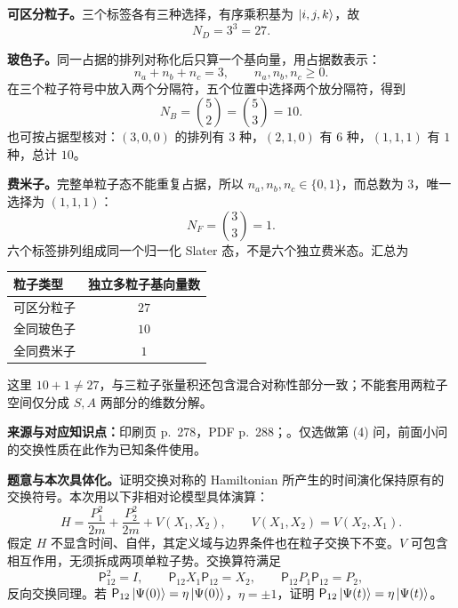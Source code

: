 \begin{checkedsolution}
\textbf{可区分粒子。}三个标签各有三种选择，有序乘积基为 $\left|i,j,k\right\rangle$，故
\begin{equation}
  \boxed{N_D=3^3=27}.
\end{equation}

\textbf{玻色子。}同一占据的排列对称化后只算一个基向量，用占据数表示：
\begin{equation}
  n_a+n_b+n_c=3,\qquad n_a,n_b,n_c\ge0.
\end{equation}
在三个粒子符号中放入两个分隔符，五个位置中选择两个放分隔符，得到
\begin{equation}
  \boxed{N_B=\binom52=\binom53=10}.
\end{equation}
也可按占据型核对：$(3,0,0)$ 的排列有 $3$ 种，$(2,1,0)$ 有 $6$ 种，$(1,1,1)$ 有 $1$ 种，总计 $10$。

\textbf{费米子。}完整单粒子态不能重复占据，所以 $n_a,n_b,n_c\in\{0,1\}$，而总数为 $3$，唯一选择为 $(1,1,1)$：
\begin{equation}
  \boxed{N_F=\binom33=1}.
\end{equation}
六个标签排列组成同一个归一化 Slater 态，不是六个独立费米态。汇总为
\begin{center}
\begin{tabular}{lc}
  \toprule
  粒子类型 & 独立多粒子基向量数 \\
  \midrule
  可区分粒子 & $27$ \\
  全同玻色子 & $10$ \\
  全同费米子 & $1$ \\
  \bottomrule
\end{tabular}
\end{center}
这里 $10+1\ne27$，与三粒子张量积还包含混合对称性部分一致；不能套用两粒子空间仅分成 $S,A$ 两部分的维数分解。
\end{checkedsolution}

\textbf{来源与对应知识点：}印刷页 p.~278，PDF p.~288；。仅选做第 (4) 问，前面小问的交换性质在此作为已知条件使用。

\textbf{题意与本次具体化。}证明交换对称的 Hamiltonian 所产生的时间演化保持原有的交换符号。本次用以下非相对论模型具体演算：
\begin{equation}
  H=\frac{P_1^2}{2m}+\frac{P_2^2}{2m}+V(X_1,X_2),\qquad
  V(X_1,X_2)=V(X_2,X_1).
\end{equation}
假定 $H$ 不显含时间、自伴，其定义域与边界条件也在粒子交换下不变。$V$ 可包含相互作用，无须拆成两项单粒子势。交换算符满足
\begin{equation}
  \mathsf P_{12}^2=I,\qquad
  \mathsf P_{12}X_1\mathsf P_{12}=X_2,\qquad
  \mathsf P_{12}P_1\mathsf P_{12}=P_2,
\end{equation}
反向交换同理。若 $\mathsf P_{12}\left|\Psi(0)\right\rangle=\eta\left|\Psi(0)\right\rangle$，$\eta=\pm1$，证明 $\mathsf P_{12}\left|\Psi(t)\right\rangle=\eta\left|\Psi(t)\right\rangle$。

